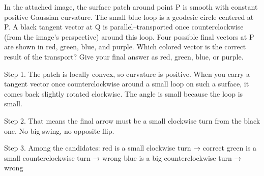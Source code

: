 In the attached image, the surface patch around point P is smooth with constant positive Gaussian curvature. The small blue loop is a geodesic circle centered at P. A black tangent vector at Q is parallel–transported once counterclockwise (from the image's perspective) around this loop. Four possible final vectors at P are shown in red, green, blue, and purple. Which colored vector is the correct result of the transport? Give your final answer as red, green, blue, or purple.


Step 1. The patch is locally convex, so curvature is positive. When you carry a tangent vector once counterclockwise around a small loop on such a surface, it comes back slightly rotated clockwise. The angle is small because the loop is small.

Step 2. That means the final arrow must be a small clockwise turn from the black one. No big swing, no opposite flip.

Step 3. Among the candidates:
red is a small clockwise turn → correct
green is a small counterclockwise turn → wrong
blue is a big counterclockwise turn → wrong